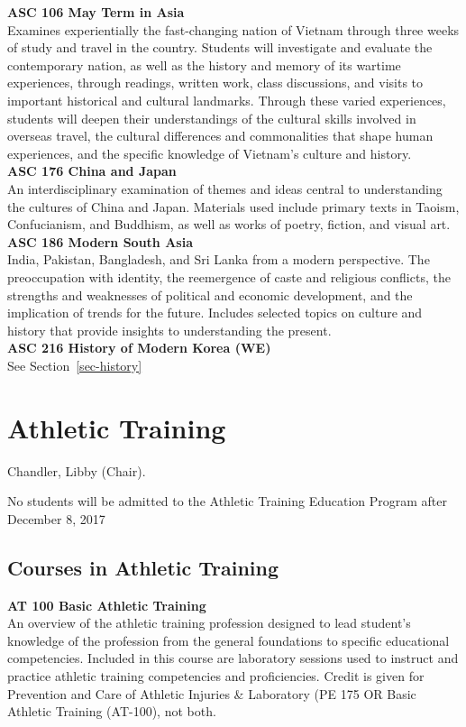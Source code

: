 \documentclass[
  letterpaper,
]{scrbook}
\begin{document}
\textbf{ASC 106 May Term in Asia}\\
Examines experientially the fast-changing nation of Vietnam through
three weeks of study and travel in the country. Students will
investigate and evaluate the contemporary nation, as well as the history
and memory of its wartime experiences, through readings, written work,
class discussions, and visits to important historical and cultural
landmarks. Through these varied experiences, students will deepen their
understandings of the cultural skills involved in overseas travel, the
cultural differences and commonalities that shape human experiences, and
the specific knowledge of Vietnam's culture and history.\\
\textbf{ASC 176 China and Japan}\\
An interdisciplinary examination of themes and ideas central to
understanding the cultures of China and Japan. Materials used include
primary texts in Taoism, Confucianism, and Buddhism, as well as works of
poetry, fiction, and visual art.\\
\textbf{ASC 186 Modern South Asia}\\
India, Pakistan, Bangladesh, and Sri Lanka from a modern perspective.
The preoccupation with identity, the reemergence of caste and religious
conflicts, the strengths and weaknesses of political and economic
development, and the implication of trends for the future. Includes
selected topics on culture and history that provide insights to
understanding the present.\\
\textbf{ASC 216 History of Modern Korea (WE)}\\
See Section~\ref{sec-history}

\section{Athletic Training}\label{athletic-training}

Chandler, Libby (Chair).

No students will be admitted to the Athletic Training Education Program
after December 8, 2017

\subsection{Courses in Athletic
Training}\label{courses-in-athletic-training}

\textbf{AT 100 Basic Athletic Training}\\
An overview of the athletic training profession designed to lead
student's knowledge of the profession from the general foundations to
specific educational competencies. Included in this course are
laboratory sessions used to instruct and practice athletic training
competencies and proficiencies. Credit is given for Prevention and Care
of Athletic Injuries \& Laboratory (PE 175 OR Basic Athletic Training
(AT-100), not both.
\end{document}
